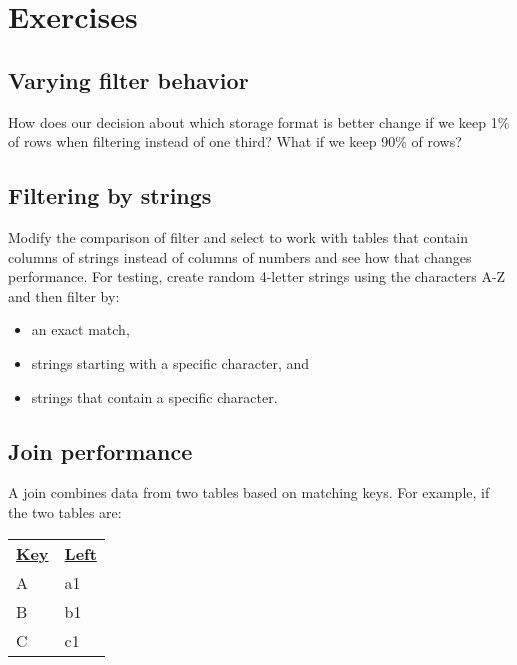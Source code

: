 \documentclass[krantzl]{krantz}
\begin{document}
\section{Exercises}\label{data-table-exercises}

\subsection*{Varying filter behavior}


How does our decision about which storage format is better change
if we keep 1\% of rows when filtering instead of one third?
What if we keep 90\% of rows?

\subsection*{Filtering by strings}


Modify the comparison of filter and select to work with tables
that contain columns of strings instead of columns of numbers
and see how that changes performance.
For testing,
create random 4-letter strings using the characters A-Z
and then filter by:

\begin{itemize}

\item an exact match,

\item strings starting with a specific character, and

\item strings that contain a specific character.

\end{itemize}

\subsection*{Join performance}


A join combines data from two tables based on matching keys.
For example,
if the two tables are:


\vspace{\baselineskip}
\begin{tabular}{ll}
\textbf{\underline{Key}} & \textbf{\underline{Left}} \\
A & a1 \\
B & b1 \\
C & c1 \\
\end{tabular}
\end{document}
